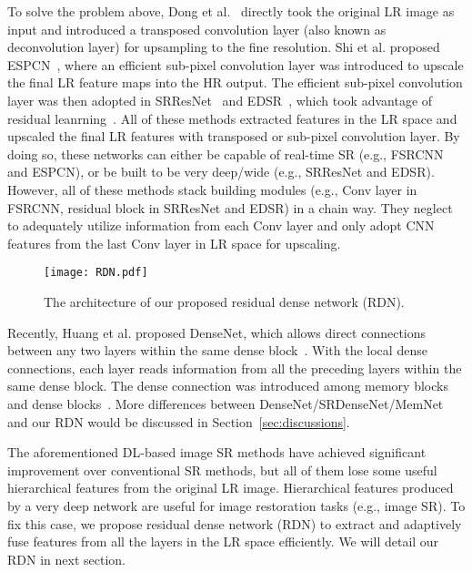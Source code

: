 \documentclass[10pt,twocolumn,letterpaper]{article}
\begin{document}
To solve the problem above, Dong et al.~\cite{dong2016accelerating} directly took the original LR image as input and introduced a transposed convolution layer (also known as deconvolution layer) for upsampling to the fine resolution. Shi et al. proposed ESPCN~\cite{shi2016real}, where an efficient sub-pixel convolution layer was introduced to upscale the final LR feature maps into the HR output. The efficient sub-pixel convolution layer was then adopted in SRResNet~\cite{ledig2017photo} and EDSR~\cite{lim2017enhanced}, which took advantage of residual leanrning~\cite{he2016deep}. All of these methods extracted features in the LR space and upscaled the final LR features with transposed or sub-pixel convolution layer. By doing so, these networks can either be capable of real-time SR (e.g., FSRCNN and ESPCN), or be built to be very deep/wide (e.g., SRResNet and EDSR). However, all of these methods stack building modules (e.g., Conv layer in FSRCNN, residual block in SRResNet and EDSR) in a chain way. They neglect to adequately utilize information from each Conv layer and only adopt CNN features from the last Conv layer in LR space for upscaling.
\begin{figure*}[htbp]
\centering
\texttt{[image: RDN.pdf]}
\caption{The architecture of our proposed residual dense network (RDN).}
\label{fig:RDN} 
\vspace{-4mm}  
\end{figure*}


Recently, Huang et al. proposed DenseNet, which allows direct connections between any two layers within the same dense block~\cite{huang2017densely}. With the local dense connections, each layer reads information from all the preceding layers within the same dense block. The dense connection was introduced among memory blocks~\cite{tai2017memnet} and dense blocks~\cite{tong2017image}. More differences between DenseNet/SRDenseNet/MemNet and our RDN would be discussed in Section~\ref{sec:discussions}.

The aforementioned DL-based image SR methods have achieved significant improvement over conventional SR methods, but all of them lose some useful hierarchical features from the original LR image. Hierarchical features produced by a very deep network are useful for image restoration tasks (e.g., image SR). To fix this case, we propose residual dense network (RDN) to extract and adaptively fuse features from all the layers in the LR space efficiently. We will detail our RDN in next section.
\end{document}
